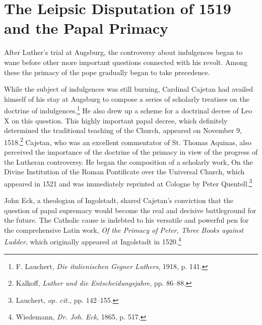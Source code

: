 \section{The Leipsic Disputation of 1519 and the Papal Primacy}

After Luther’s trial at Augsburg, the controversy about indulgences
began to wane before other more important questions connected with
his revolt. Among these the primacy of the pope gradually began to
take precedence.

While the subject of indulgences was still burning, Cardinal Cajetan had
availed himself of his stay at Augsburg to compose a series
of scholarly treatises on the doctrine of indulgences.\footnote
{F. Lauchert, \textit{Die italienischen Gegner Luthers}, 1918, p. 141.}
He also drew
up a scheme for a doctrinal decree of Leo X on this question. This
highly important papal decree, which definitely determined the traditional
teaching of the Church, appeared on November 9, 1518.\footnote
{Kalkoff, \textit{Luther und die Entscheidungsjahre}, pp. 86--88.}
Cajetan, who was an excellent commentator of St. Thomas Aquinas,
also perceived the importance of the doctrine of the primacy in view
of the progress of the Lutheran controversy. He began the composition of
a scholarly work, On the Divine Institution of the Roman
Pontificate over the Universal Church, which appeared in 1521 and
was immediately reprinted at Cologne by Peter Quentell.\footnote{Lauchert, \textit{op. cit.}, pp. 142--155.}

John Eck, a theologian of Ingolstadt, shared Cajetan’s conviction
that the question of papal supremacy would become the real and decisive
battleground for the future. The Catholic cause is indebted to
his versatile and powerful pen for the comprehensive Latin work, \textit{Of
the Primacy of Peter, Three Books against Ludder}, which originally
appeared at Ingolstadt in 1520.\footnote{Wiedemann, \textit{Dr. Joh. Eck}, 1865, p. 517.}

